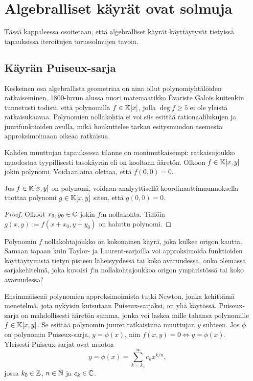 \section{Algebralliset käyrät ovat solmuja}
Tässä kappaleessa osoitetaan, että algebralliset käyrät käyttäytyvät tietyissä tapauksissa iteroitujen torussolmujen tavoin.

\subsection{Käyrän Puiseux-sarja}
Keskeinen osa algebrallista geometriaa on aina ollut polynomiyhtälöiden ratkaiseminen. 1800-luvun alussa nuori matemaatikko Évariste Galois kuitenkin tunnetusti todisti, että polynomilla $f\in\mathbb{K}[x]$, jolla $\deg f\geq5$ ei ole yleistä ratkaisukaavaa. Polynomien nollakohtia ei voi siis esittää rationaalilukujen ja juurifunktioiden avulla, mikä houkuttelee tarkan esitysmuodon asemesta approksimoimaan oikeaa ratkaisua.

Kahden muuttujan tapauksessa tilanne on monimutkaisempi: ratkaisujoukko muodostaa tyypillisesti tasokäyrän eli on kooltaan ääretön. Olkoon $f\in\mathbb{K}[x,y]$ jokin polynomi. Voidaan aina olettaa, että $f(0,0)=0$.
\begin{propositio}
    Jos $f\in\mathbb{K}[x,y]$ on polynomi, voidaan analyyttisellä koordinaattimuunnoksella tuottaa polynomi $g\in\mathbb{K}[x,y]$ siten, että $g(0,0)=0$.
\end{propositio}
\begin{proof}
    Olkoot $x_0,y_0\in\mathbb{C}$ jokin $f$:n nollakohta. Tällöin $g(x,y):=f(x+x_0,y+y_0)$ on haluttu polynomi.
\end{proof}
Polynomin $f$ nollakohtajoukko on kokonainen käyrä, joka kulkee origon kautta. Samaan tapaan kuin Taylor- ja Laurent-sarjoilla voi approksimoida funktioiden käyttäytymistä tietyn pisteen läheisyydessä tai koko avaruudessa, onko olemassa sarjakehitelmä, joka kuvaisi $f$:n nollakohtajoukkoa origon ympäristössä tai koko avaruudessa? 

Ensimmäisenä polynomien approksimoimista tutki Newton, jonka kehittämä menetelmä, jota nykyisin kutsutaan Puiseux-sarjaksi, on yhä käytössä. Puiseux-sarja on mahdollisesti ääretön summa, jonka voi laskea mille tahansa polynomille $f\in\mathbb{K}[x,y]$. Se esittää polynomin juuret ratkaistuna muuttujan $y$ suhteen. Jos $\phi$ on polynomin Puiseux-sarja, $y=\phi(x)$, niin $f(x,y)=0\Leftrightarrow y=\phi(x)$. Yleisesti Puiseux-sarjat ovat muotoa
\begin{equation*}
    y=\phi(x)=\sum_{k=k_0}^{\infty}c_kx^{k/n},
\end{equation*}
jossa $k_0\in\mathbb{Z}$, $n\in\mathbb{N}$ ja $c_k\in\mathbb{C}$. 


